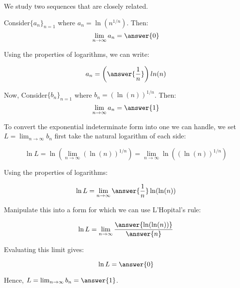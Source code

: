 \documentclass{ximera}
\author{Jim Talamo}
\begin{document}
\begin{exercise}
 We study two sequences that are closely related. 
 
Consider$\{a_n \}_{n=1}$ where $a_n = \ln\left(n^{1/n}\right)$.  Then:
\[
\lim_{n \to \infty} a_n = \answer{0}
\]

\begin{hint}
Using the properties of logarithms, we can write:

\[
a_n= \left(\answer{\frac{1}{n}}\right)ln(n)
\]
\end{hint}

Now, Consider$\{b_n \}_{n=1}$ where $b_n = (\ln(n))^{1/n}$.  Then:
\[
\lim_{n \to \infty} a_n = \answer{1}
\]

\begin{hint}
To convert the exponential indeterminate form into one we can handle, we set $L = \lim_{n \to \infty} b_n$ first take the natural logarithm of each side:


\[
\ln L= \ln \left(\lim_{n \to \infty} (\ln(n))^{1/n}\right) = \lim_{n \to \infty}  \ln \left((\ln(n))^{1/n}\right)
\]
\begin{question}

Using the properties of logarithms:

\[
\ln L= \lim_{n \to \infty} \answer{\frac{1}{n}} \ln(\ln(n))
\]
\begin{question}

Manipulate this into a form for which we can use L'Hopital's rule:

\[
\ln L = \lim_{n \to \infty} \frac{\answer{\ln(\ln(n))}}{\answer{n}}
\]

\begin{question}
Evaluating this limit gives:

\[
\ln L = \answer{0}
\]

Hence, $L= \lim_{n \to \infty} b_n = \answer{1}$.

\end{question}
\end{question}
\end{question}
\end{hint}


\end{exercise}
\end{document}
